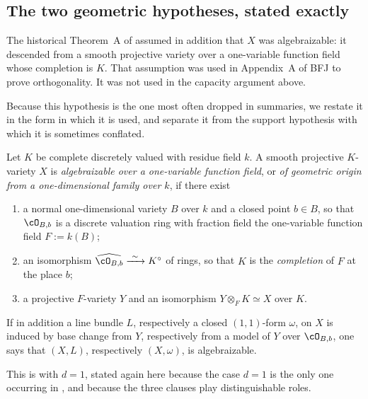 \subsection{The two geometric hypotheses, stated exactly}
\label{sec:ch29-two-geometric}

The historical Theorem~A of \cite{BFJ15} assumed in addition that \(X\) was
algebraizable: it descended from a smooth projective variety over a
one-variable function field whose completion is \(K\).  That assumption was
used in Appendix~A of BFJ to prove orthogonality.  It was not used in the
capacity argument above.

Because this hypothesis is the one most often dropped in summaries, we
restate it in the form in which it is used, and separate it from the support
hypothesis with which it is sometimes conflated.

\begin{definition}
\label{def:ch29-algebraizable}
Let \(K\) be complete discretely valued with residue field \(k\).  A smooth
projective \(K\)-variety \(X\) is \emph{algebraizable over a one-variable
function field}, or \emph{of geometric origin from a one-dimensional family
over \(k\)}, if there exist
\begin{enumerate}
\item\label{itm:ch29-alg:curve}
 a normal one-dimensional variety \(B\) over \(k\) and a closed point
 \(b\in B\), so that \(\cO_{B,b}\) is a discrete valuation ring with
 fraction field the one-variable function field \(F:=k(B)\);
\item\label{itm:ch29-alg:completion}
 an isomorphism \(\widehat{\cO_{B,b}}\xrightarrow{\ \sim\ }K^\circ\) of
 rings, so that \(K\) is the \emph{completion} of \(F\) at the place \(b\);
\item\label{itm:ch29-alg:descent}
 a projective \(F\)-variety \(Y\) and an isomorphism
 \(Y\otimes_FK\simeq X\) over \(K\).
\end{enumerate}
If in addition a line bundle \(L\), respectively a closed \((1,1)\)-form
\(\omega\), on \(X\) is induced by base change from \(Y\), respectively from
a model of \(Y\) over \(\cO_{B,b}\), one says that \((X,L)\), respectively
\((X,\omega)\), is algebraizable.
\end{definition}

This is  with \(d=1\), stated again here
because the case \(d=1\) is the only one occurring in \cite{BFJ15}, and
because the three clauses play distinguishable roles.

